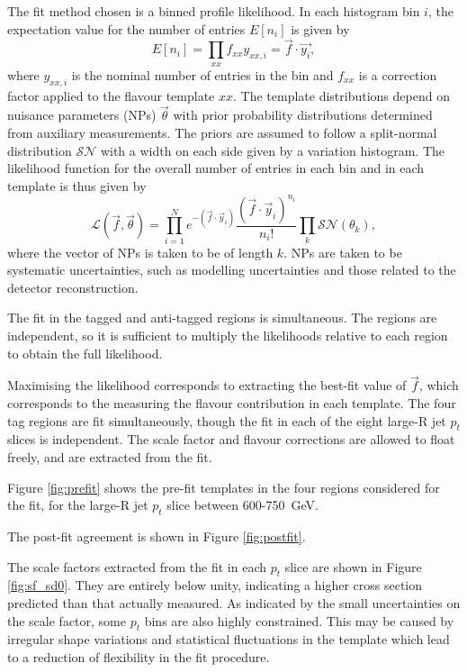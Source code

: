 \documentclass[10pt,a4paper]{book}
\begin{document}
The fit method chosen is a binned profile likelihood. In each histogram bin $i$, the expectation value for the number of entries $E[n_i]$ is given by 
\begin{equation}
    E[n_i] = \prod_{xx} f_{xx} y_{xx,i} = \vec{f} \cdot \vec{y_i},
\end{equation}
where $y_{xx,i}$ is the nominal number of entries in the bin and $f_{xx}$ is a correction factor applied to the flavour template $xx$. The template distributions depend on nuisance parameters (NPs) $\vec{\theta}$ with prior probability distributions determined from auxiliary measurements. The priors are assumed to follow a split-normal distribution $\mathcal{SN}$ with a width on each side given by a variation histogram. The likelihood function for the overall number of entries in each bin and in each template is thus given by
\begin{equation}
    \mathcal{L}(\vec{f}, \vec{\theta}) = \prod_{i=1}^{N} e^{-(\vec{f} \cdot \vec{y}_i)} \frac{(\vec{f} \cdot \vec{y}_i)^{n_i}}{n_i!} \prod_{k} \mathcal{SN}(\theta_k),
    \label{eq:placeholder}
\end{equation}
where the vector of NPs is taken to be of length $k$. NPs are taken to be systematic uncertainties, such as modelling uncertainties and those related to the detector reconstruction.

The fit in the tagged and anti-tagged regions is simultaneous. The regions are independent, so it is sufficient to multiply the likelihoods relative to each region to obtain the full likelihood.

Maximising the likelihood corresponds to extracting the best-fit value of $\vec{f}$, which corresponds to the measuring the flavour contribution in each template. The four tag regions are fit simultaneously, though the fit in each of the eight large-R jet $p_t$ slices is independent. The scale factor and flavour corrections are allowed to float freely, and are extracted from the fit.

Figure \ref{fig:prefit} shows the pre-fit templates in the four regions considered for the fit, for the large-R jet $p_t$ slice between 600-750~GeV. 

The post-fit agreement is shown in Figure \ref{fig:postfit}. 

The scale factors extracted from the fit in each $p_t$ slice are shown in Figure \ref{fig:sf_sd0}. They are entirely below unity, indicating a higher cross section predicted than that actually measured. As indicated by the small uncertainties on the scale factor, some $p_t$ bins are also highly constrained. This may be caused by irregular shape variations and statistical fluctuations in the template which lead to a reduction of flexibility in the fit procedure.
\end{document}
